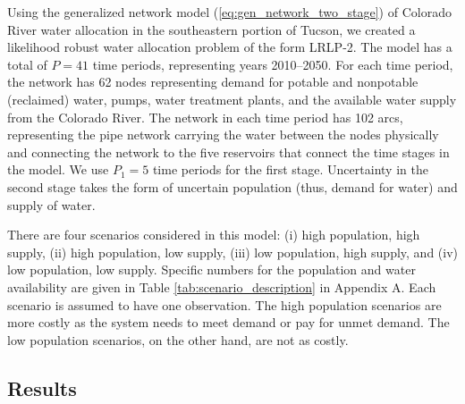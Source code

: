\documentclass[12pt]{amsart}
\begin{document}
Using the generalized network model (\ref{eq:gen_network_two_stage}) of Colorado River water allocation in the southeastern portion of Tucson, we created a likelihood robust water allocation problem of the form LRLP-2.
The model has a total of $P = 41$ time periods, representing years 2010--2050. 
For each time period, the network has 62 nodes representing demand for potable and nonpotable (reclaimed) water, pumps, water treatment plants, and the available water supply from the Colorado River.
The network in each time period has 102 arcs, representing the pipe network carrying the water between the nodes physically and connecting the network to the five reservoirs that connect the time stages in the model.
We use $P_1 = 5$ time periods for the first stage.
Uncertainty in the second stage takes the form of uncertain population (thus, demand for water) and supply of water.

There are four scenarios considered in this model: (i) high population, high supply, (ii) high population, low supply, (iii) low population, high supply, and (iv) low population, low supply.
Specific numbers for the population and water availability are given in Table \ref{tab:scenario_description} in Appendix A.
Each scenario is assumed to have one observation.
The high population scenarios are more costly as the system needs to meet demand or pay for unmet demand.
The low population scenarios, on the other hand, are not as costly. 

\subsection{Results} 
\label{sec:comp_results}
\end{document}
